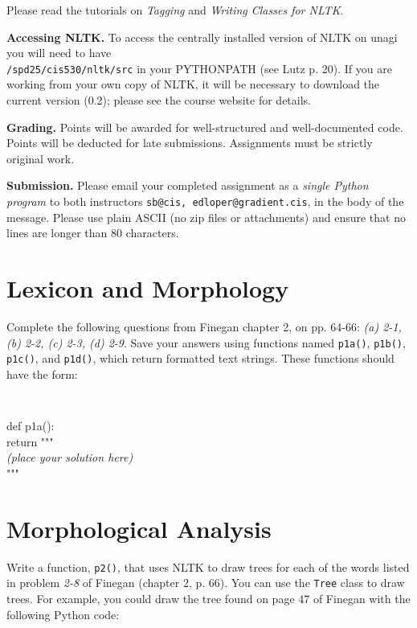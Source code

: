 \documentclass{cis530}
\begin{document}
\maketitle

Please read the tutorials on \emph{Tagging} and \emph{Writing Classes
for NLTK}.

{\bf Accessing NLTK.}  
To access the centrally installed version of NLTK on unagi you will
need to have\\ \texttt{/spd25/cis530/nltk/src} in your PYTHONPATH (see
Lutz p. 20).  If you are working from your own copy of NLTK, it will
be necessary to download the current version (0.2); please see the
course website for details.

{\bf Grading.}  
Points will be awarded for well-structured and well-documented code.
Points will be deducted for late submissions.  Assignments must be
strictly original work.

{\bf Submission.}  
Please email your completed assignment as a
\emph{single Python program} to both instructors
\texttt{sb@cis, edloper@gradient.cis}, in the body of the message.
Please use plain ASCII (no zip files or attachments) and ensure
that no lines are longer than 80 characters.

\section{Lexicon and Morphology}

Complete the following questions from Finegan chapter 2, on pp. 64-66:
\emph{(a) 2-1, (b) 2-2, (c) 2-3, (d) 2-9}.  
Save your answers using functions named
\texttt{p1a()}, \texttt{p1b()}, \texttt{p1c()}, and \texttt{p1d()}, which
return formatted text strings.  These functions should have the form:

{\tt
\begin{tabbing}
def p1a():\\
\qquad return """\\
\textit{(place your solution here)}\\
"""
\end{tabbing}
}

\section{Morphological Analysis}

Write a function, \texttt{p2()}, that uses NLTK to draw trees for each
of the words listed in problem \emph{2-8} of Finegan (chapter 2,
p. 66).  You can use the \texttt{Tree} class to draw trees.  For
example, you could draw the tree found on page 47 of Finegan with the
following Python code:
\end{document}
